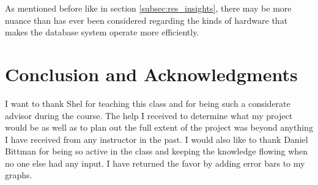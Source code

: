 \documentclass[twocolumn,11pt]{article}
\begin{document}
As mentioned before like in section \ref{subsec:res_insights}, there may be more
nuance than has ever been considered regarding the kinds of hardware that makes
the database system operate more efficiently.

\section{Conclusion and Acknowledgments}

I want to thank Shel for teaching this class and for being such a considerate
advisor during the course. The help I received to determine what my project
would be as well as to plan out the full extent of the project was beyond
anything I have received from any instructor in the past. I would also like to
thank Daniel Bittman for being so active in the class and keeping the knowledge
flowing when no one else had any input. I have returned the favor by adding
error bars to my graphs.



\end{document}
